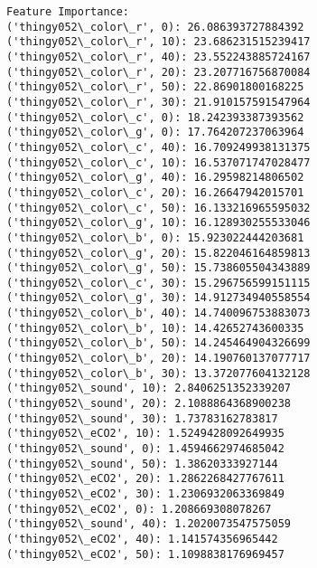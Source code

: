 \documentclass[11pt]{article}
\begin{document}
    \begin{Verbatim}[commandchars=\\\{\}]
Feature Importance:
('thingy052\_color\_r', 0): 26.086393727884392
('thingy052\_color\_r', 10): 23.686231515239417
('thingy052\_color\_r', 40): 23.552243885724167
('thingy052\_color\_r', 20): 23.207716756870084
('thingy052\_color\_r', 50): 22.86901800168225
('thingy052\_color\_r', 30): 21.910157591547964
('thingy052\_color\_c', 0): 18.242393387393562
('thingy052\_color\_g', 0): 17.764207237063964
('thingy052\_color\_c', 40): 16.709249938131375
('thingy052\_color\_c', 10): 16.537071747028477
('thingy052\_color\_g', 40): 16.29598214806502
('thingy052\_color\_c', 20): 16.26647942015701
('thingy052\_color\_c', 50): 16.133216965595032
('thingy052\_color\_g', 10): 16.128930255533046
('thingy052\_color\_b', 0): 15.923022444203681
('thingy052\_color\_g', 20): 15.822046164859813
('thingy052\_color\_g', 50): 15.738605504343889
('thingy052\_color\_c', 30): 15.296756599151115
('thingy052\_color\_g', 30): 14.912734940558554
('thingy052\_color\_b', 40): 14.740096753883073
('thingy052\_color\_b', 10): 14.42652743600335
('thingy052\_color\_b', 50): 14.245464904326699
('thingy052\_color\_b', 20): 14.190760137077717
('thingy052\_color\_b', 30): 13.372077604132128
('thingy052\_sound', 10): 2.8406251352339207
('thingy052\_sound', 20): 2.1088864368900238
('thingy052\_sound', 30): 1.73783162783817
('thingy052\_eCO2', 10): 1.5249428092649935
('thingy052\_sound', 0): 1.4594662974685042
('thingy052\_sound', 50): 1.38620333927144
('thingy052\_eCO2', 20): 1.2862268427767611
('thingy052\_eCO2', 30): 1.2306932063369849
('thingy052\_eCO2', 0): 1.208669308078267
('thingy052\_sound', 40): 1.2020073547575059
('thingy052\_eCO2', 40): 1.141574356965442
('thingy052\_eCO2', 50): 1.1098838176969457
    \end{Verbatim}
\end{document}
